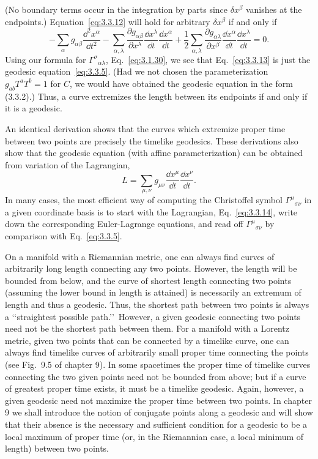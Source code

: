 (No boundary terms occur in the integration by parts since $\delta x^\beta$ vanishes at the
endpoints.) Equation~\eqref{eq:3.3.12} will hold for arbitrary $\delta x^\beta$ if and only if
\begin{equation}
  -\sum_\alpha g_{\alpha\beta}\frac{\dd^2x^\alpha}{\dd t^2}
  -\sum_{\alpha,\lambda}\frac{\partial g_{\alpha\beta}}{\partial x^\lambda}
  \frac{\dd x^\lambda}{\dd t}\frac{\dd x^\alpha}{\dd t}
  +\frac{1}{2}\sum_{\alpha,\lambda}
  \frac{\partial g_{\alpha\lambda}}{\partial x^\beta}
  \frac{\dd x^\alpha}{\dd t}\frac{\dd x^\lambda}{\dd t}=0.
  \tag{3.3.13}\label{eq:3.3.13}
\end{equation}
Using our formula for $\Gamma^\sigma{}_{\alpha\lambda}$, Eq.~\eqref{eq:3.1.30}, we see that Eq.~\eqref{eq:3.3.13} is just
the geodesic equation~\eqref{eq:3.3.5}. (Had we not chosen the parameterization
$g_{ab}T^aT^b=1$ for $C$, we would have obtained the geodesic equation in the form
(3.3.2).) Thus, a curve extremizes the length between its endpoints if and only if it
is a geodesic.

An identical derivation shows that the curves which extremize proper time between two points are precisely the timelike geodesics. These derivations also show
that the geodesic equation (with affine parameterization) can be obtained from
variation of the Lagrangian,
\begin{equation}
  L=\sum_{\mu,\nu}g_{\mu\nu}\frac{\dd x^\mu}{\dd t}\frac{\dd x^\nu}{\dd t}.
  \tag{3.3.14}\label{eq:3.3.14}
\end{equation}
In many cases, the most efficient way of computing the Christoffel symbol
$\Gamma^\mu{}_{\sigma\nu}$ in a given coordinate basis is to start with the Lagrangian, Eq.~\eqref{eq:3.3.14}, write
down the corresponding Euler-Lagrange equations, and read off $\Gamma^\mu{}_{\sigma\nu}$ by comparison
with Eq.~\eqref{eq:3.3.5}.

On a manifold with a Riemannian metric, one can always find curves of arbitrarily
long length connecting any two points. However, the length will be bounded from
below, and the curve of shortest length connecting two points (assuming the lower
bound in length is attained) is necessarily an extremum of length and thus a geodesic.
Thus, the shortest path between two points is always a \lq\lq straightest possible path.\rq\rq\
However, a given geodesic connecting two points need not be the shortest path
between them. For a manifold with a Lorentz metric, given two points that can be
connected by a timelike curve, one can always find timelike curves of arbitrarily
small proper time connecting the points (see Fig.~9.5 of chapter 9). In some spacetimes the proper time of timelike curves connecting the two given points need not
be bounded from above; but if a curve of greatest proper time exists, it must be a
timelike geodesic. Again, however, a given geodesic need not maximize the proper
time between two points. In chapter 9 we shall introduce the notion of conjugate
points along a geodesic and will show that their absence is the necessary and
sufficient condition for a geodesic to be a local maximum of proper time (or, in the
Riemannian case, a local minimum of length) between two points.

